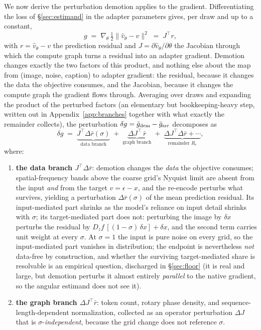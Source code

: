 We now derive the perturbation demotion applies to the gradient.
Differentiating the loss of \S\ref{sec:estimand} in the adapter
parameters gives, per draw and up to a constant,
\begin{equation*}
g \;=\; \nabla_\theta\, \tfrac{1}{2}
\big\|\hat v_\theta - v\big\|^2 \;=\; J^{\!\top} r,
\end{equation*}
with $r = \hat v_\theta - v$ the prediction residual and
$J = \partial \hat v_\theta / \partial \theta$ the Jacobian through
which the compute graph turns a residual into an adapter gradient.
Demotion changes exactly the two factors of this product, and nothing
else about the map from (image, noise, caption) to adapter gradient:
the residual, because it changes the data the objective consumes, and
the Jacobian, because it changes the compute graph the gradient flows
through. Averaging over draws and expanding the product of
the perturbed factors (an elementary but bookkeeping-heavy step,
written out in Appendix~\ref{app:branches} together with what exactly
the remainder collects), the perturbation
$\delta g = \bar g_{\mathrm{dem}} - \bar g_{\mathrm{src}}$ decomposes as
\begin{equation}
\delta g \;=\;
\underbrace{J^{\!\top}\Delta \bar r(\sigma)}_{\text{data branch}}
\;+\; \underbrace{\Delta J^{\!\top}\, \bar r}_{\text{graph branch}}
\;+\; \underbrace{\Delta J^{\!\top}\Delta \bar r + \cdots}_{\text{remainder }R_e},
\label{eq:branches}
\end{equation}
where:

\begin{enumerate}
\item \textbf{the data branch $J^{\!\top}\Delta\bar r$}: demotion changes the \emph{data}
the objective consumes; spatial-frequency bands above the coarse
grid's Nyquist limit are absent from the input \emph{and} from the
target $v = \epsilon - x$, and the re-encode perturbs what survives,
yielding a perturbation $\Delta \bar r(\sigma)$ of the mean prediction
residual.
Its input-mediated part shrinks as the model's reliance on input detail
shrinks with $\sigma$; its target-mediated part does not: perturbing the
image by $\delta x$ perturbs the residual by
$D_z f\,[(1{-}\sigma)\,\delta x] + \delta x$, and the second term
carries unit weight at every $\sigma$. At $\sigma{=}1$ the input is pure
noise on every grid, so the input-mediated part vanishes in
distribution; the endpoint is nevertheless \emph{not} data-free by
construction, and whether the surviving target-mediated share is
resolvable is an empirical question, discharged in \S\ref{sec:floor}
(it is real and large, but demotion perturbs it almost entirely
\emph{parallel} to the native gradient, so the angular estimand does
not see it).
\item \textbf{the graph branch $\Delta J^{\!\top}\bar r$}: token count, rotary phase
density, and sequence-length-dependent normalization, collected as an
operator perturbation $\Delta J$ that is $\sigma$-\emph{independent},
because the grid change does not reference $\sigma$.
\end{enumerate}

